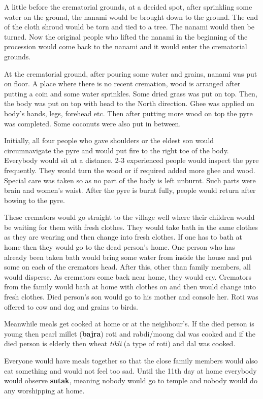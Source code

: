 A little before the crematorial grounds, at a decided spot, after sprinkling
some water on the ground, the nanami would be brought down to the ground. The
end of the cloth shroud would be torn and tied to a tree. The nanami would then
be turned. Now the original people who lifted the nanami in the beginning of the
procession would come back to the nanami and it would enter the crematorial
grounds.

At the crematorial ground, after pouring some water and grains, nanami was put
on floor. A place where there is no recent cremation, wood is arranged after
putting a coin and some water sprinkles. Some dried grass was put on top. Then,
the body was put on top with head to the North direction. Ghee was applied on
body's hands, legs, forehead etc. Then after putting more wood on top the pyre
was completed. Some coconuts were also put in between.

Initially, all four people who gave shoulders or the eldest son would
circumnavigate the pyre and would put fire to the right toe of the body.
Everybody would sit at a distance. 2-3 experienced people would inspect the
pyre frequently. They would turn the wood or if required added more ghee and
wood. Special care was taken so as no part of the body is left unburnt. Such
parts were brain and women's waist. After the pyre is burnt fully, people would
return after bowing to the pyre.

These cremators would go straight to the village well where their children
would be waiting for them with fresh clothes. They would take bath in the same
clothes as they are wearing and then change into fresh clothes. If one has to
bath at home then they would go to the dead person's home. One person who has
already been taken bath would bring some water from inside the house and put
some on each of the cremators head. After this, other than family members, all
would disperse. As cremators come back near home, they would cry. Cremators
from the family would bath at home with clothes on and then would change into
fresh clothes. Died person's son would go to his mother and console her. Roti
was offered to cow and dog and grains to birds.

Meanwhile meals get cooked at home or at the neighbour's. If the died person is
young then pearl millet (\textbf{bajra}) roti and rabdi/moong dal was cooked
and if the died person is elderly then wheat \textit{tikli} (a type of roti)
and dal was cooked.

Everyone would have meals together so that the close family members would also
eat something and would not feel too sad. Until the 11th day at home everybody
would observe \textbf{sutak}, meaning nobody would go to temple and nobody
would do any worshipping at home. 

